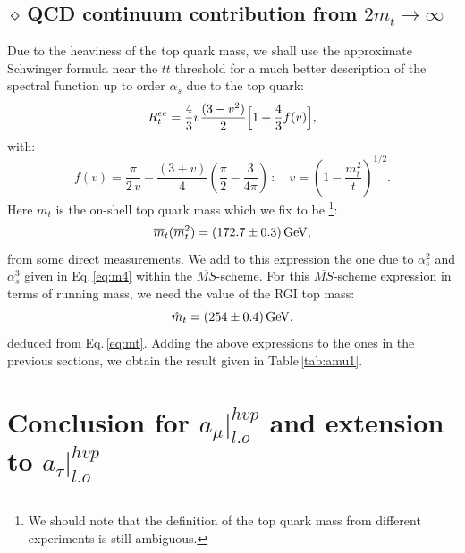 \documentclass[review]{elsarticle}
\def\beq{\begin{equation}}
\def\eeq{\end{equation}}
\def\ga{\left(}
\def\dr{\right)}
\def\d{$\diamond~$}
\begin{document}
\subsection*{ \vspace*{0.5cm} \d QCD continuum contribution from  $2m_t\to\infty$}
Due to the heaviness of the top quark mass, we shall use the approximate Schwinger formula near the $\bar tt$ threshold
for a much better description of the spectral function up to order $\alpha_s$ due to the top quark:
\beq
R_t^{ee}=\frac{4}{3} v\frac{(3-v^2)}{2}\Big{[} 1+\frac{4}{3}f(v)\Big{]},
\eeq
with:
\beq
f(v)=\frac{\pi}{2\, v}-\frac{(3+v)}{4}\ga \frac{\pi}{2}-\frac{3}{4\pi}\dr\,:\,\,\,\,\,\, v=\ga 1-\frac{m_t^2}{t}\dr^{1/2}.
\eeq
Here $m_t$ is the on-shell top quark mass which we fix to be\,\cite{PDG}\,\footnote{We should note that the definition of the top quark mass from different experiments is still ambiguous.}: 
\beq
\overline{m}_t(\overline{m}_t^2)=(172.7\pm 0.3)\,{\rm  GeV},
\label{eq:mt}
\eeq
 from some  direct measurements.
We add to this expression the  one due to $\alpha_s^2$ and $\alpha_s^3$ given in Eq.\,\ref{eq:m4} within the $\overline {MS}$-scheme.  For this $\overline {MS}$-scheme expression  in terms of running mass, we need the value of the RGI top mass:
\beq
\hat m_t=(254\pm 0.4)\,{\rm GeV},
\eeq
deduced from Eq.\,\ref{eq:mt}.
Adding the above expressions to the ones in the previous sections, we obtain the result given in Table\,\ref{tab:amu1}. 
\section{Conclusion for $a_\mu\vert^{hvp}_{l.o}$ and extension to $a_\tau\vert^{hvp}_{l.o}$}
\end{document}
